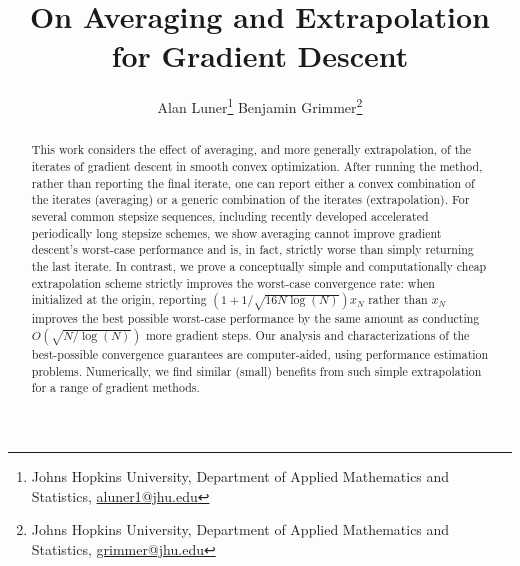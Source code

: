 \documentclass[11pt]{article}
\numberwithin{equation}{section}
\theoremstyle{definition}
\theoremstyle{definition}
\theoremstyle{definition}
\newcommand{\1}{\mathbf{1}}
\begin{document}
    \title{On Averaging and Extrapolation for Gradient Descent}

    \author{Alan Luner\footnote{Johns Hopkins University, Department of Applied Mathematics and Statistics, \url{aluner1@jhu.edu}} \qquad Benjamin Grimmer\footnote{Johns Hopkins University, Department of Applied Mathematics and Statistics, \url{grimmer@jhu.edu}}}

	\date{}
	\maketitle

	\begin{abstract}
This work considers the effect of averaging, and more generally extrapolation, of the iterates of gradient descent in smooth convex optimization. After running the method, rather than reporting the final iterate, one can report either a convex combination of the iterates (averaging) or a generic combination of the iterates (extrapolation). For several common stepsize sequences, including recently developed accelerated periodically long stepsize schemes, we show averaging cannot improve gradient descent's worst-case performance and is, in fact, strictly worse than simply returning the last iterate. In contrast, we prove a conceptually simple and computationally cheap extrapolation scheme strictly improves the worst-case convergence rate: when initialized at the origin, reporting $(1+1/\sqrt{16N\log(N)})x_N$ rather than $x_N$ improves the best possible worst-case performance by the same amount as conducting $O(\sqrt{N/\log(N)})$ more gradient steps. Our analysis and characterizations of the best-possible convergence guarantees are computer-aided, using performance estimation problems. Numerically, we find similar (small) benefits from such simple extrapolation for a range of gradient methods.
	\end{abstract}
\end{document}
